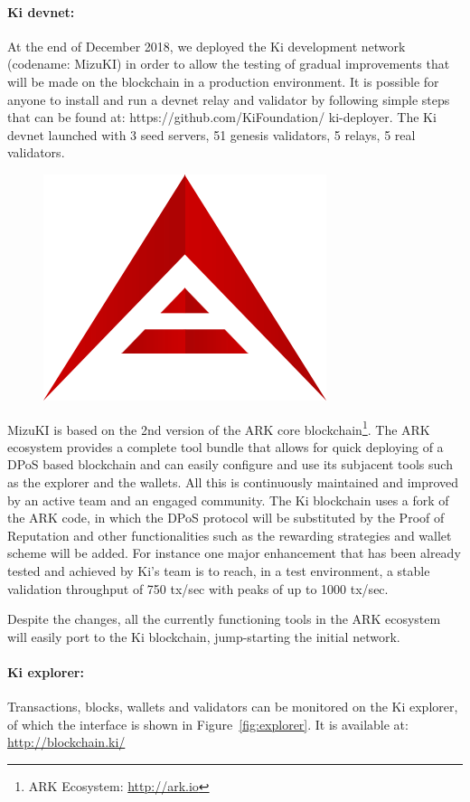 \paragraph{Ki devnet:} At the end of December 2018, we deployed the Ki development network (codename: MizuKI) in order to allow the testing of gradual improvements that will be made on the blockchain in a production environment. It is possible for anyone to install and run a devnet relay and validator by following simple steps that can be found at: https://github.com/KiFoundation/ ki-deployer. The Ki devnet launched with 3 seed servers, 51 genesis validators, 5 relays, 5 real validators.

\begin{figure}[!ht]
    \centering
	\includegraphics[width=0.3\linewidth, trim= 0cm 0cm 0cm 0cm, clip]{Figures/ark.png}
	\label{fig:ark}
\end{figure}

MizuKI is based on the 2nd version of the ARK core blockchain\footnote{ARK Ecosystem: \url{http://ark.io}}. The ARK ecosystem provides a complete tool bundle that allows for quick deploying of a DPoS based blockchain and can easily configure and use its subjacent tools such as the explorer and the wallets. All this is continuously maintained and improved by an active team and an engaged community. The Ki blockchain uses a fork of the ARK code, in which the DPoS protocol will be substituted by the Proof of Reputation and other functionalities such as the rewarding strategies and wallet scheme will be added. For instance one major enhancement that has been already tested and achieved by Ki's team is to reach, in a test environment, a stable validation throughput of 750 tx/sec with peaks of up to 1000 tx/sec.

Despite the changes, all the currently functioning tools in the ARK ecosystem will easily port to the Ki blockchain, jump-starting the initial network.

\paragraph{Ki explorer:} Transactions, blocks, wallets and validators can be monitored on the Ki explorer, of which the interface is shown in Figure~\ref{fig:explorer}. It is available at: \url{http://blockchain.ki/}

